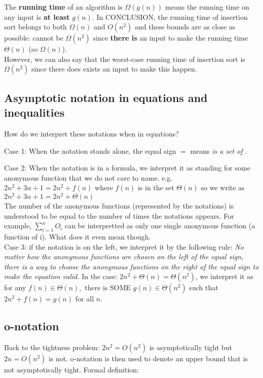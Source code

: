\documentclass{article}
\begin{document}
 The \textbf{running time} of an algorithm is $\Omega(g(n))$ means the running time on any input is \textbf{at least} $g(n)$. In CONCLUSION, the running time of insertion sort belongs to both $\Omega(n)$ and $O(n^2)$ and these bounds are as close as possible: cannot be $\Omega(n^2)$ since \textbf{there is} an input to make the running time $\Theta(n)$ (so $\Omega(n)$).\\
 
 However, we can also say that the worst-case running time of insertion sort is $\Omega(n^2)$ since there does exists an input to make this happen.
 
 
\subsection*{Asymptotic notation in equations and inequalities}
How do we interpret these notations when in equations?

Case 1: When the notation stands alone, the equal sign $=$ means \textit{is a set of }. 

Case 2: When the notation is in a formula, we interpret it as standing for some anonymous function that we do not care to name. e.g. $2n^2+3n+1 = 2n^2+f(n)$ where $f(n)$ is in the set $\Theta(n)$ so we write as $2n^2+3n+1 = 2n^2+\Theta(n)$\\

The number of the anonymous functions (represented by the notations) is understood to be equal to the number of times the notations appears. For example, $\sum_{i=1}^{n}O_i$ can be interpretted as only one single anonymous function (a function of i). {\color{red} What does it even mean though.}\\

Case 3: if the notation is on the left, we interpret it by the following rule:
\textit{No matter how the anonymous
functions are chosen on the left of the equal sign, there is a way to choose
the anonymous functions on the right of the equal sign to make the equation valid. } In the case: $2n^2 +\Theta(n) = \Theta(n^2)$, we interpret it as for any $f(n)\in \Theta(n), $ there is SOME $g(n) \in \Theta(n^2)$ such that $2n^2 +f(n) = g(n)$ for all $n$.
\subsection*{o-notation}
Back to the tightness problem: $2n^2 = O(n^2)$ is asymptotically tight but $2n = O(n^2)$ is not. o-notation is then used to
denote an upper bound that is not asymptotically tight. Formal definition: \\
\end{document}
